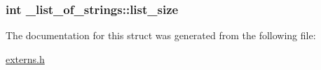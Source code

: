 \subsubsection[{\texorpdfstring{list\+\_\+size}{list_size}}]{\setlength{\rightskip}{0pt plus 5cm}int \+\_\+list\+\_\+of\+\_\+strings\+::list\+\_\+size}\hypertarget{struct__list__of__strings_ad48afe20c96c5b80e7fb6728bb1af3ad}{}\label{struct__list__of__strings_ad48afe20c96c5b80e7fb6728bb1af3ad}


The documentation for this struct was generated from the following file\+:\begin{DoxyCompactItemize}
\item 
\hyperlink{externs_8h}{externs.\+h}\end{DoxyCompactItemize}
